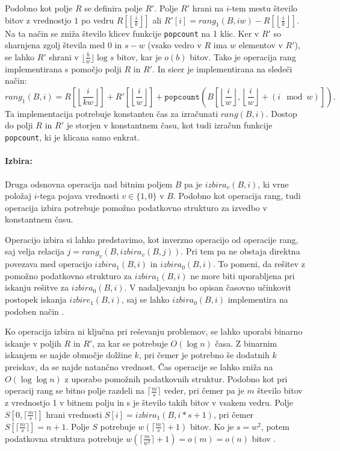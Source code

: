 Podobno kot polje $R$ se definira polje $R'$. Polje $R'$ hrani na $i$-tem mestu število bitov z vrednostjo $1$ po vedru $R[\left\lfloor\frac{i}{k} \right\rfloor]$ ali $R'[i]=rang_1(B,iw)-R[\left\lfloor\frac{i}{k} \right\rfloor]$. Na ta način se zniža število klicev funkcije \texttt{popcount} na 1 klic. Ker v $R'$ so sharnjena zgolj števila med 0 in $s-w$ (vsako vedro v $R$ ima $w$ elementov v $R'$), se lahko $R'$ shrani v $\lfloor\frac{b}{w}\rfloor\log{s}$ bitov, kar je $o(b)$ bitov. Tako je operacija rang implementirana s pomočjo polji $R$ in $R'$. In sicer je implementirana na sledeči način:
\begin{equation}
    rang_1(B,i)=R\left[\left\lfloor\frac{i}{kw} \right\rfloor\right]+ R'\left[\left\lfloor\frac{i}{w} \right\rfloor\right]+\texttt{popcount}\left(B\left[\left\lfloor\frac{i}{w} \right\rfloor,\left\lfloor\frac{i}{w} \right\rfloor+(i \mod w)\right]\right).
\end{equation}
Ta implementacija potrebuje konstanten čas za izračunati $rang(B,i)$. Dostop do polji $R$ in $R'$ je storjen v konstantnem času, kot tudi izračun funkcije \texttt{popcount}, ki je klicana samo enkrat\cite{Navarro2016}.

\paragraph{Izbira:}
Druga odsnovna operacija nad bitnim poljem $B$ pa je $izbira_v(B,i)$, ki vrne položaj $i$-tega pojava vrednosti $v\in\{1,0\}$ v $B$. Podobno kot operacija rang, tudi operacija izbira potrebuje pomožno podatkovno strukturo za izvedbo v konstantnem času. 

Operacijo izbira si lahko predstavimo, kot inverzno operacijo od operacije rang, saj velja relacija $j=rang_v(B,izbira_v(B,j))$. Pri tem pa ne obstaja direktna povezava med operacijo $izbira_1(B,i)$ in $izbira_0(B,i)$. To pomeni, da rešitev z pomožno podatkovno strukturo za $izbira_1(B,i)$ ne more biti uporabljena pri iskanju rešitve za $izbira_0(B,i)$. V nadaljevanju bo opisan časovno učinkovit postopek iskanja $izbire_1(B,i)$, saj se lahko $izbira_0(B,i)$ implementira na podoben način \cite{Navarro2016}.

Ko operacija izbira ni ključna pri reševanju problemov, se lahko uporabi binarno iskanje v poljih $R$ in $R'$, za kar se potrebuje $O(\log{n})$ časa. Z binarnim iskanjem se najde območje dolžine $k$, pri čemer je potrebno še dodatnih $k$ preiskav, da se najde natančno vrednost.
Čas operacije se lahko zniža na $O(\log\log n)$ z uporabo pomožnih podatkovnih struktur. Podobno kot pri operacij rang se bitno polje razdeli na $\lceil \frac{m}{s} \rceil$ veder, pri čemer pa je $m$ število bitov z vrednostjo 1 v bitnem polju in s je število takih bitov v vsakem vedru. Polje $S[0,\lceil \frac{m}{s} \rceil]$ hrani vrednosti $S[i]=izbira_1(B,i*s+1)$, pri čemer $S[\lceil \frac{m}{s} \rceil]=n+1$. Polje $S$ potrebuje $w(\lceil \frac{m}{s} \rceil +1)$ bitov. Ko je $s=w^2$, potem podatkovna struktura potrebuje $w(\lceil\frac{m}{w^2}\rceil+1)=o(m)=o(n)$ bitov \cite{Navarro2016}.

